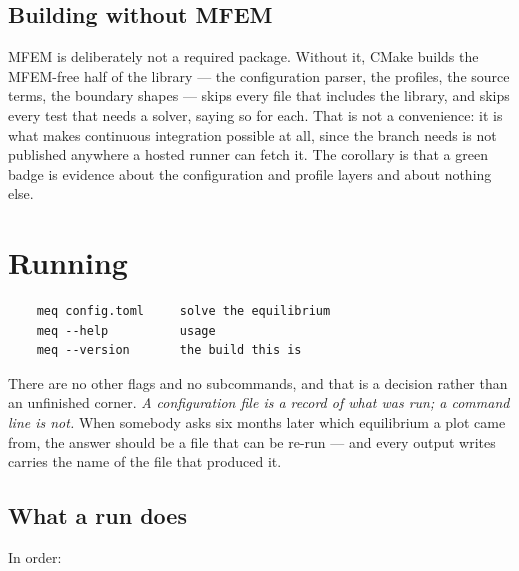 \subsection{Building without MFEM}

MFEM is deliberately not a required package. Without it, CMake builds the
MFEM-free half of the library --- the configuration parser, the profiles, the
source terms, the boundary shapes --- skips every file that includes the
library, and skips every test that needs a solver, saying so for each. That is
not a convenience: it is what makes continuous integration possible at all,
since the branch {\meq} needs is not published anywhere a hosted runner can
fetch it. The corollary is that a green badge is evidence about the
configuration and profile layers and about nothing else.

\section{Running}

\begin{verbatim}
    meq config.toml     solve the equilibrium
    meq --help          usage
    meq --version       the build this is
\end{verbatim}

There are no other flags and no subcommands, and that is a decision rather than
an unfinished corner. \emph{A configuration file is a record of what was run; a
command line is not.} When somebody asks six months later which equilibrium a
plot came from, the answer should be a file that can be re-run --- and every
output {\meq} writes carries the name of the file that produced it.

\subsection{What a run does}

In order:

